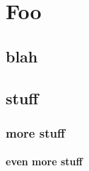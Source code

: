\documentclass[openany]{memoir}
\begin{document}
\chapter{Foo}
\section{blah}
\section{stuff}
\subsection{more stuff}
\subsubsection{even more stuff}
\end{document}
